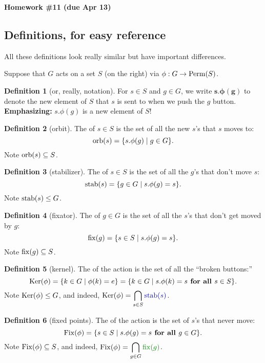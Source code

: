\documentclass[12pt]{article}
\theoremstyle{definition} %
\newtheorem*{definition}{Definition}
\renewcommand{\section}[1]{\begin{center} \textbf{#1} \\\end{center}}
\begin{document}
\section{Homework \#11 (due Apr 13)}

\subsection*{Definitions, for easy reference}

All these definitions look really similar but have important differences. 

Suppose that $G$ acts on a set $S$ (on the right) via $\phi:G\to \operatorname{Perm}(S)$.

\begin{definition}[or, really, notation]
  For $s\in S$ and $g\in G$, we write $\mathbf{s.\phi(g)}$ to denote the new element of $S$ that $s$ is sent to when we push the $g$ button. \textbf{Emphasizing:} $s.\phi(g)$ is a new element of $S$!
\end{definition}

\begin{definition}[orbit]
  The  of $s\in S$ is the set of all the new $s$'s that $s$ moves to: \[\operatorname{orb}(s) = \{s.\phi(g) \mid g\in G\}.\]
  Note $\operatorname{orb}(s) \subseteq S$.
\end{definition}

\begin{definition}[stabilizer]
  The  of $s\in S$ is the set of all the $g$'s that don't move $s$: \[\operatorname{stab}(s) = \{g \in G \mid s.\phi(g) = s\}.\]  
  Note $\operatorname{stab}(s) \leq G$.
\end{definition}

\begin{definition}[fixator]
  The  of $g\in G$ is the set of all the $s$'s that don't get moved by $g$: \[\operatorname{fix}(g) = \{s\in S \mid s.\phi(g) = s\}.\]  
  Note $\operatorname{fix}(g) \subseteq S$.
\end{definition}

\begin{definition}[kernel]
  The  of the action is the set of all the ``broken buttons:'' \[\operatorname{Ker}(\phi) = \{k\in G \mid \phi(k) = e\} = \{k\in G \mid s.\phi(k) = s \textbf{ for all }s\in S\}.\]
  Note $\operatorname{Ker}(\phi) \leq G$, and indeed, $\displaystyle\Ker(\phi) = \bigcap_{s\in S} \Balert{\stab(s)}$.
\end{definition}

\begin{definition}[fixed points]
  The  of the action is the set of $s$'s that never move: \[\operatorname{Fix}(\phi) = \{s\in S \mid s.\phi(g) = s \textbf{ for all } g\in G\}.\]  
  Note $\operatorname{Fix}(\phi) \subseteq S$, and indeed, $\displaystyle\Fix(\phi) = \bigcap_{g\in G} \Galert{\fix(g)}$.
\end{definition}
\end{document}
